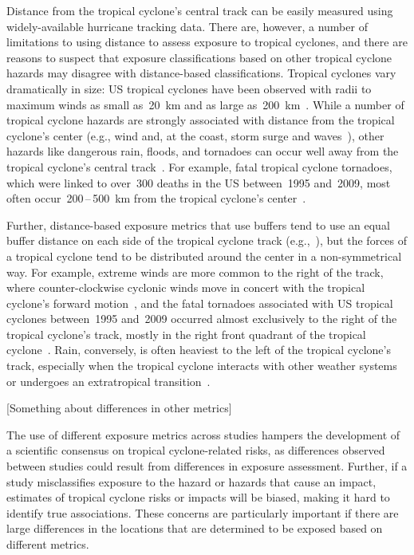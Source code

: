 Distance from the tropical cyclone's central track can be easily measured using
widely-available hurricane tracking data. There are, however, a number of
limitations to using distance to assess exposure to tropical cyclones, and
there are reasons to suspect that exposure classifications based on other
tropical cyclone hazards may disagree with distance-based classifications.
Tropical cyclones vary dramatically in size: \ac{US} tropical cyclones have
been observed with radii to maximum winds as small as~20~\si{\kilo\metre} and as
large as~200~\si{\kilo\metre}~\citep{mallin2006, quiring2011variations}. While a
number of tropical cyclone hazards are strongly associated with distance from
the tropical cyclone's center (e.g., wind and, at the coast, storm surge and
waves~\citep{rappaport2000, kruk2010}), other hazards like dangerous rain,
floods, and tornadoes can occur well away from the tropical cyclone's central
track~\citep{rappaport2000, atallah2007, moore2012}.  For example, fatal
tropical cyclone tornadoes, which were linked to over~300 deaths in the \ac{US}
between~1995 and~2009, most often occur~200\,--\,500~\si{\kilo\metre} from the
tropical cyclone's center~\citep{moore2012}. 

Further, distance-based exposure metrics that use
buffers tend to use an equal buffer distance on each side of the tropical
cyclone track (e.g.,~\cite{czajkowski2011, grabich2015, grabich2016,
zandbergen2009, tansel2010}), but the forces of a tropical cyclone tend to be
distributed around the center in a non-symmetrical way. For example, extreme
winds are more common to the right of the track, where counter-clockwise
cyclonic winds move in concert with the tropical cyclone's forward 
motion~\citep{halverson2015}, and the fatal tornadoes associated with \ac{US} tropical
cyclones between~1995 and~2009 occurred almost exclusively to the right of the
tropical cyclone's track, mostly in the right front quadrant of the tropical
cyclone~\citep{moore2012}. Rain, conversely, is often heaviest to the left of
the tropical cyclone's track, especially when the tropical cyclone interacts
with other weather systems~\citep{atallah2003, atallah2007, zhu2013variations}
or undergoes an extratropical transition~\citep{elsberry2002}.

[Something about differences in other metrics]

The use of different exposure metrics across studies hampers the development of
a scientific consensus on tropical cyclone-related risks, as differences
observed between studies could result from differences in exposure assessment.
Further, if a study misclassifies exposure to the hazard or hazards that cause
an impact, estimates of tropical cyclone risks or impacts will be biased,
making it hard to identify true associations. These concerns are particularly
important if there are large differences in the locations that are determined
to be exposed based on different metrics.  

